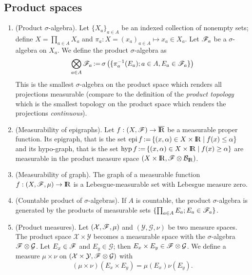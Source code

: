 \documentclass[a4paper,10pt]{article}
\begin{document}
\subsection{Product spaces}
\begin{enumerate}
 \item (Product $\sigma$-algebra). Let $\{X_a\}_{a\in A}$ be an indexed collection of nonempty sets; define 
       $X=\prod_{a\in A}X_a$ and $\pi_a: X = (x_a)_{a\in A} \mapsto x_a\in X_a$. Let $\mathscr{F}_a$ be a $\sigma$-algebra
       on $X_a$. We define the product $\sigma$-algebra as
       \[
        \bigotimes_{a\in A} \mathscr{F}_a {}\mathop{\mathrel{:}=}{} \sigma\left( \{\pi_a^{-1}(E_a);a\in A, E_a\in \mathscr{F}_a\}\right)
       \]
       This is the smallest $\sigma$-algebra on the product space which renders all projections measurable
       (compare to the definition of the \textit{product topology} which is the smallest topology on 
       the product space which renders the projections \textit{continuous}).
       
 \item (Measurability of epigraphs). Let $f:(X,\F)\to\barre$ be a measurable proper function. Its epigraph, that is
       the set $\epi f \dfn \{(x,\alpha)\in X\times \Re {}\mid{} f(x) \leq \alpha\}$ and its hypo-graph, that is
       the set $\hyp f \dfn \{(x,\alpha) \in X\times \Re {}\mid{} f(x) \geq \alpha\}$ are measurable in the product
       measure space $(X\times \Re, \F\otimes \B_\Re)$.
       
 \item (Measurability of graph). The graph of a measurable function $f:(X,\F,\mu)\to\Re$ is a Lebesgue-measurable set 
       with Lebesgue measure zero.
       
 \item (Countable product of $\sigma$-algebras). If $A$ is countable, the product $\sigma$-algebra       
       is generated by the products of measurable sets $\{\prod_{a\in A}E_a; E_a\in \mathscr{F}_a\}$.
       
 \item (Product measures). Let $(\mathcal{X},\mathscr{F},\mu)$ and $(\mathcal{Y},\mathcal{G},\nu)$ be two measure spaces.
       The product space $\mathcal{X}\times \mathcal{Y}$ becomes a measurable space with the $\sigma$-algebra 
       $\mathscr{F}\otimes \mathcal{G}$. Let $E_x\in\mathscr{F}$ and $E_y\in\mathcal{G}$; then $E_x\times E_y\in\mathscr{F}\otimes \mathcal{G}$.
       We define a measure $\mu\times\nu$ on $(\mathcal{X}\times \mathcal{Y}, \mathscr{F}\otimes\mathcal{G})$ with 
       \[
        (\mu\times \nu)(E_x\times E_y) = \mu(E_x) \nu(E_y).
       \]
       

\end{enumerate}
\end{document}
